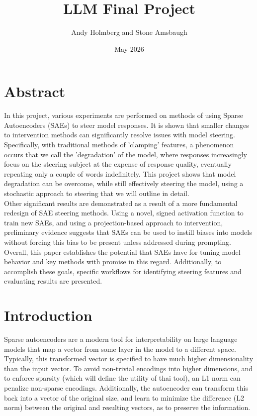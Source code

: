 \documentclass{article}
\title{LLM Final Project}
\author{Andy Holmberg and Stone Amsbaugh}
\date{May 2026}
\begin{document}
\maketitle

\section{Abstract}

In this project, various experiments are performed on methods of using Sparse Autoencoders (SAEs) to steer model responses. It is shown that smaller changes to intervention methods can significantly resolve issues with model steering. Specifically, with traditional methods of 'clamping' features, a phenomenon occurs that we call the 'degradation' of the model, where responses increasingly focus on the steering subject at the expense of response quality, eventually repeating only a couple of words indefinitely. This project shows that model degradation can be overcome, while still effectively steering the model, using a stochastic approach to steering that we will outline in detail.\\

Other significant results are demonstrated as a result of a more fundamental redesign of SAE steering methods. Using a novel, signed activation function to train new SAEs, and using a projection-based approach to intervention, preliminary evidence suggests that SAEs can be used to instill biases into models without forcing this bias to be present unless addressed during prompting.\\

Overall, this paper establishes the potential that SAEs have for tuning model behavior and key methods with promise in this regard. Additionally, to accomplish these goals, specific workflows for identifying steering features and evaluating results are presented.

\section{Introduction}
Sparse autoencoders are a modern tool for interpretability on large language models that map a vector from some layer in the model to a different space. Typically, this transformed vector is specified to have much higher dimensionality than the input vector. To avoid non-trivial encodings into higher dimensions, and to enforce sparsity (which will define the utility of thai tool), an L1 norm can penalize non-sparse encodings. Additionally, the autoencoder can transform this back into a vector of the original size, and learn to minimize the difference (L2 norm) between the original and resulting vectors, as to preserve the information.\\
\end{document}
